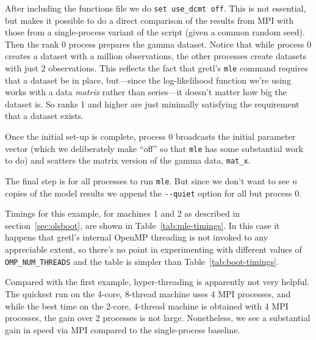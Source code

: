 \documentclass{article}
\begin{document}
After including the functions file we do \texttt{set use\_dcmt
  off}. This is not essential, but makes it possible to do a direct
comparison of the results from MPI with those from a single-process
variant of the script (given a common random seed). Then the rank 0
process prepares the gamma dataset. Notice that while process 0
creates a dataset with a million observations, the other processes
create datasets with just 2 observations. This reflects the fact that
gretl's \texttt{mle} command requires that a dataset be in place,
but---since the log-likelihood function we're using works with a data
\textit{matrix} rather than series---it doesn't matter how big the
dataset is. So ranks 1 and higher are just minimally satisfying
the requirement that a dataset exists.

Once the initial set-up is complete, process 0 broadcasts the initial
parameter vector (which we deliberately make ``off'' so that
\texttt{mle} has some substantial work to do) and scatters the matrix
version of the gamma data, \verb|mat_x|.

The final step is for all processes to run \texttt{mle}. But since we
don't want to see $n$ copies of the model results we append the
\verb|--quiet| option for all but process 0.

Timings for this example, for machines 1 and 2 as described in
section~\ref{sec:olsboot}, are shown in Table~\ref{tab:mle-timings}.
In this case it happens that gretl's internal \textsf{OpenMP}
threading is not invoked to any appreciable extent, so there's no
point in experimenting with different values of \verb|OMP_NUM_THREADS|
and the table is simpler than Table~\ref{tab:boot-timings}.

Compared with the first example, hyper-threading is apparently not
very helpful. The quickest run on the 4-core, 8-thread machine uses 4
MPI processes, and while the best time on the 2-core, 4-thread machine
is obtained with 4 MPI processes, the gain over 2 processes is not
large. Nonetheless, we see a substantial gain in speed via MPI
compared to the single-process baseline.
\end{document}
